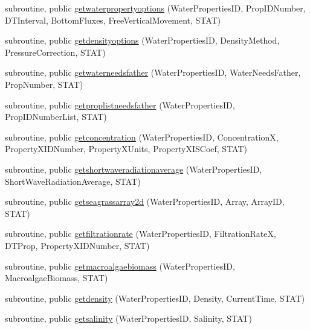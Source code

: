 \begin{DoxyCompactItemize}
subroutine, public \mbox{\hyperlink{namespacemodulewaterproperties_aab0b283f67aa51240519cab03610aab7}{getwaterpropertyoptions}} (Water\+Properties\+ID, Prop\+I\+D\+Number, D\+T\+Interval, Bottom\+Fluxes, Free\+Vertical\+Movement, S\+T\+AT)
\item 
subroutine, public \mbox{\hyperlink{namespacemodulewaterproperties_ac9026fc793014229d0d9bed57148db6a}{getdensityoptions}} (Water\+Properties\+ID, Density\+Method, Pressure\+Correction, S\+T\+AT)
\item 
subroutine, public \mbox{\hyperlink{namespacemodulewaterproperties_a97df80c3a8c997c208dac464d58c0f8c}{getwaterneedsfather}} (Water\+Properties\+ID, Water\+Needs\+Father, Prop\+Number, S\+T\+AT)
\item 
subroutine, public \mbox{\hyperlink{namespacemodulewaterproperties_ac8bf28f0c63fb495a5f90cf0d6563ae6}{getproplistneedsfather}} (Water\+Properties\+ID, Prop\+I\+D\+Number\+List, S\+T\+AT)
\item 
subroutine, public \mbox{\hyperlink{namespacemodulewaterproperties_a45cbba90a6054db2070c49281da1ef56}{getconcentration}} (Water\+Properties\+ID, ConcentrationX, Property\+X\+I\+D\+Number, Property\+X\+Units, Property\+X\+I\+S\+Coef, S\+T\+AT)
\item 
subroutine, public \mbox{\hyperlink{namespacemodulewaterproperties_a821377ba47455562f8f8a055ad136a15}{getshortwaveradiationaverage}} (Water\+Properties\+ID, Short\+Wave\+Radiation\+Average, S\+T\+AT)
\item 
subroutine, public \mbox{\hyperlink{namespacemodulewaterproperties_a627fb9974f1a0e254f8b0f6dfa4653ea}{getseagrassarray2d}} (Water\+Properties\+ID, Array, Array\+ID, S\+T\+AT)
\item 
subroutine, public \mbox{\hyperlink{namespacemodulewaterproperties_a66ca6cd5369fd51e843c91e5992b9050}{getfiltrationrate}} (Water\+Properties\+ID, Filtration\+RateX, D\+T\+Prop, Property\+X\+I\+D\+Number, S\+T\+AT)
\item 
subroutine, public \mbox{\hyperlink{namespacemodulewaterproperties_a786f352ede780fcaec30c57d6653f0f1}{getmacroalgaebiomass}} (Water\+Properties\+ID, Macroalgae\+Biomass, S\+T\+AT)
\item 
subroutine, public \mbox{\hyperlink{namespacemodulewaterproperties_a5d3bf3d9b122b9eee78afc56a4047507}{getdensity}} (Water\+Properties\+ID, Density, Current\+Time, S\+T\+AT)
\item 
subroutine, public \mbox{\hyperlink{namespacemodulewaterproperties_a3bb9d317e5be992645961cb331bdb55a}{getsalinity}} (Water\+Properties\+ID, Salinity, S\+T\+AT)

\end{DoxyCompactItemize}
